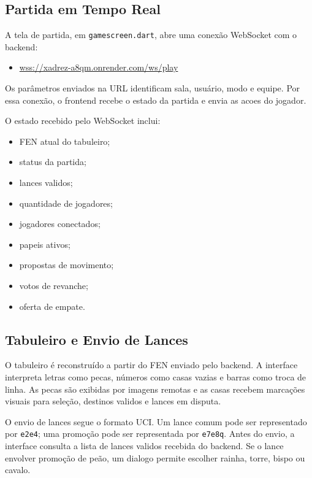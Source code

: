 \documentclass[12pt]{article}
\begin{document}
\subsection{Partida em Tempo Real}

A tela de partida, em \texttt{gamescreen.dart}, abre uma conexão WebSocket com o backend:

\begin{itemize}
    \item \url{wss://xadrez-a8qm.onrender.com/ws/play}
\end{itemize}

Os parâmetros enviados na URL identificam sala, usuário, modo e equipe. Por essa conexão, o frontend recebe o estado da partida e envia as acoes do jogador.

O estado recebido pelo WebSocket inclui:

\begin{itemize}
    \item FEN atual do tabuleiro;
    \item status da partida;
    \item lances validos;
    \item quantidade de jogadores;
    \item jogadores conectados;
    \item papeis ativos;
    \item propostas de movimento;
    \item votos de revanche;
    \item oferta de empate.
\end{itemize}

\subsection{Tabuleiro e Envio de Lances}

O tabuleiro é reconstruído a partir do FEN enviado pelo backend. A interface interpreta letras como pecas, números como casas vazias e barras como troca de linha. As pecas são exibidas por imagens remotas e as casas recebem marcações visuais para seleção, destinos validos e lances em disputa.

O envio de lances segue o formato UCI. Um lance comum pode ser representado por \texttt{e2e4}; uma promoção pode ser representada por \texttt{e7e8q}. Antes do envio, a interface consulta a lista de lances validos recebida do backend. Se o lance envolver promoção de peão, um dialogo permite escolher rainha, torre, bispo ou cavalo.
\end{document}
